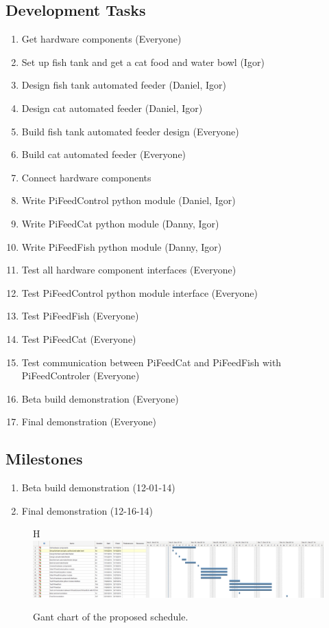 \subsection{Development Tasks}
\begin{enumerate}
    \item Get hardware components (Everyone)
    \item Set up fish tank and get a cat food and water bowl (Igor)
    \item Design fish tank automated feeder (Daniel, Igor)
    \item Design cat automated feeder (Daniel, Igor)
    \item Build fish tank automated feeder design (Everyone)
    \item Build cat automated feeder (Everyone)
    \item Connect hardware components
    \item Write PiFeedControl python module (Daniel, Igor)
    \item Write PiFeedCat python module (Danny, Igor)
    \item Write PiFeedFish python module (Danny, Igor)
    \item Test all hardware component interfaces (Everyone)
    \item Test PiFeedControl python module interface (Everyone)
    \item Test PiFeedFish (Everyone)
    \item Test PiFeedCat (Everyone)
    \item Test communication between PiFeedCat and PiFeedFish with
          PiFeedControler (Everyone)
    \item Beta build demonstration (Everyone)
    \item Final demonstration (Everyone)

\end{enumerate}

\subsection{Milestones}
\begin{enumerate}
    \item Beta build demonstration (12-01-14)
    \item Final demonstration (12-16-14)
\end{enumerate}

\begin{figure}{H}
    \centering
    \captionsetup{justification=centering, margin = 0.5cm}
    \includegraphics[scale=0.3]{images/Gant} 
    \caption{Gant chart of the proposed schedule.}
    \label{fig:gant}
\end{figure}



